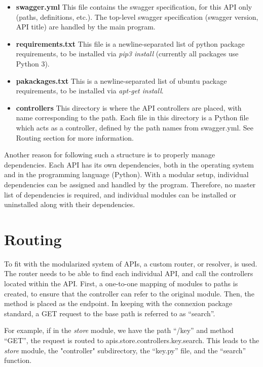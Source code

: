 \begin{itemize}
    \item \textbf{swagger.yml} This file contains the swagger specification, for this API only (paths, definitions, etc.). The top-level swagger specification (swagger version, API title) are handled by the main program.
    
    \item \textbf{requirements.txt} This file is a newline-separated list of python package requirements, to be installed via \textit{pip3 install} (currently all packages use Python 3).

    \item \textbf{pakackages.txt} This is a newline-separated list of ubuntu package requirements, to be installed via \textit{apt-get install}.
    
    \item \textbf{controllers} This directory is where the API controllers are placed, with name corresponding to the path. Each file in this directory is a Python file which acts as a controller, defined by the path names from swagger.yml. See Routing section for more information.
\end{itemize}

Another reason for following such a structure is to properly manage dependencies. Each API has its own dependencies, both in the operating system and in the programming language (Python). With a modular setup, individual dependencies can be assigned and handled by the program. Therefore, no master list of dependencies is required, and individual modules can be installed or uninstalled along with their dependencies.

\section{Routing}

To fit with the modularized system of APIs, a custom router, or resolver, is used. The router needs to be able to find each individual API, and call the controllers located within the API. First, a one-to-one mapping of modules to paths is created, to ensure that the controller can refer to the original module. Then, the method is placed as the endpoint. In keeping with the connexion package standard, a GET request to the base path is referred to as ``search''.\cite{hid-sp18-526-www-connexion}

For example, if in the \textit{store} module, we have the path ``/key'' and method ``GET'', the request is routed to apis.store.controllers.key.search. This leads to the \textit{store} module, the "controller" subdirectory, the ``key.py'' file, and the ``search'' function.


